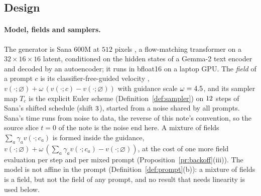 \documentclass{article}
\theoremstyle{plain}
\theoremstyle{remark}
\begin{document}
\subsection{Design}\label{sec:e3_design}

\paragraph{Model, fields and samplers.}
The generator is Sana 600M at $512$ pixels \citep{xie2025sana}, a flow-matching transformer on a $32\times16\times16$ latent,
conditioned on the hidden states of a Gemma-2 text encoder and decoded by an autoencoder; it runs in bfloat16 on a laptop GPU. The
\emph{field} of a prompt $c$ is its classifier-free-guided velocity \citep{ho2022classifier},
$v(\cdot;\varnothing)+\omega\,(v(\cdot;c)-v(\cdot;\varnothing))$ with guidance scale $\omega=4.5$, and its sampler map $T_c$
is the explicit Euler scheme (Definition~\ref{def:sampler}) on $12$ steps of Sana's shifted schedule (shift $3$),
started from a noise shared by all prompts. Sana's time runs from noise to data, the reverse of this note's convention, so the
source slice $t=0$ of the note is the noise end here. A mixture of fields $\sum_a\gamma_av(\cdot;c_a)$ is formed inside the
guidance, $v(\cdot;\varnothing)+\omega\,(\sum_a\gamma_av(\cdot;c_a)-v(\cdot;\varnothing))$, at the cost of one more field evaluation
per step and per mixed prompt (Proposition~\ref{pr:backoff}(iii)). The model is not affine in the prompt
(Definition~\ref{def:prompt}(b)): a mixture of fields is a field, but not the field of any prompt, and no result that needs
linearity is used below.
\end{document}
